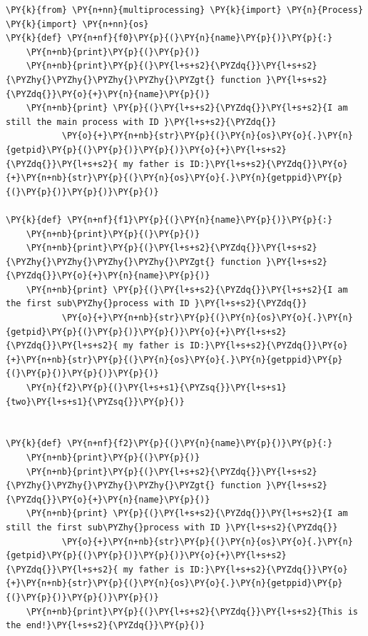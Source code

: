 \begin{Verbatim}[label=\makebox{\url{https://github.com/lucabaldini/cmepda/tree/master/slides/latex/snippets/FatherAndSons.py}},commandchars=\\\{\}]
\PY{k}{from} \PY{n+nn}{multiprocessing} \PY{k}{import} \PY{n}{Process}
\PY{k}{import} \PY{n+nn}{os}
\PY{k}{def} \PY{n+nf}{f0}\PY{p}{(}\PY{n}{name}\PY{p}{)}\PY{p}{:}
    \PY{n+nb}{print}\PY{p}{(}\PY{p}{)}
    \PY{n+nb}{print}\PY{p}{(}\PY{l+s+s2}{\PYZdq{}}\PY{l+s+s2}{\PYZhy{}\PYZhy{}\PYZhy{}\PYZhy{}\PYZgt{} function }\PY{l+s+s2}{\PYZdq{}}\PY{o}{+}\PY{n}{name}\PY{p}{)}
    \PY{n+nb}{print} \PY{p}{(}\PY{l+s+s2}{\PYZdq{}}\PY{l+s+s2}{I am still the main process with ID }\PY{l+s+s2}{\PYZdq{}}
           \PY{o}{+}\PY{n+nb}{str}\PY{p}{(}\PY{n}{os}\PY{o}{.}\PY{n}{getpid}\PY{p}{(}\PY{p}{)}\PY{p}{)}\PY{o}{+}\PY{l+s+s2}{\PYZdq{}}\PY{l+s+s2}{ my father is ID:}\PY{l+s+s2}{\PYZdq{}}\PY{o}{+}\PY{n+nb}{str}\PY{p}{(}\PY{n}{os}\PY{o}{.}\PY{n}{getppid}\PY{p}{(}\PY{p}{)}\PY{p}{)}\PY{p}{)}

\PY{k}{def} \PY{n+nf}{f1}\PY{p}{(}\PY{n}{name}\PY{p}{)}\PY{p}{:}
    \PY{n+nb}{print}\PY{p}{(}\PY{p}{)}
    \PY{n+nb}{print}\PY{p}{(}\PY{l+s+s2}{\PYZdq{}}\PY{l+s+s2}{\PYZhy{}\PYZhy{}\PYZhy{}\PYZhy{}\PYZgt{} function }\PY{l+s+s2}{\PYZdq{}}\PY{o}{+}\PY{n}{name}\PY{p}{)}
    \PY{n+nb}{print} \PY{p}{(}\PY{l+s+s2}{\PYZdq{}}\PY{l+s+s2}{I am the first sub\PYZhy{}process with ID }\PY{l+s+s2}{\PYZdq{}}
           \PY{o}{+}\PY{n+nb}{str}\PY{p}{(}\PY{n}{os}\PY{o}{.}\PY{n}{getpid}\PY{p}{(}\PY{p}{)}\PY{p}{)}\PY{o}{+}\PY{l+s+s2}{\PYZdq{}}\PY{l+s+s2}{ my father is ID:}\PY{l+s+s2}{\PYZdq{}}\PY{o}{+}\PY{n+nb}{str}\PY{p}{(}\PY{n}{os}\PY{o}{.}\PY{n}{getppid}\PY{p}{(}\PY{p}{)}\PY{p}{)}\PY{p}{)}
    \PY{n}{f2}\PY{p}{(}\PY{l+s+s1}{\PYZsq{}}\PY{l+s+s1}{two}\PY{l+s+s1}{\PYZsq{}}\PY{p}{)}


\PY{k}{def} \PY{n+nf}{f2}\PY{p}{(}\PY{n}{name}\PY{p}{)}\PY{p}{:}
    \PY{n+nb}{print}\PY{p}{(}\PY{p}{)}
    \PY{n+nb}{print}\PY{p}{(}\PY{l+s+s2}{\PYZdq{}}\PY{l+s+s2}{\PYZhy{}\PYZhy{}\PYZhy{}\PYZhy{}\PYZgt{} function }\PY{l+s+s2}{\PYZdq{}}\PY{o}{+}\PY{n}{name}\PY{p}{)}
    \PY{n+nb}{print} \PY{p}{(}\PY{l+s+s2}{\PYZdq{}}\PY{l+s+s2}{I am still the first sub\PYZhy{}process with ID }\PY{l+s+s2}{\PYZdq{}}
           \PY{o}{+}\PY{n+nb}{str}\PY{p}{(}\PY{n}{os}\PY{o}{.}\PY{n}{getpid}\PY{p}{(}\PY{p}{)}\PY{p}{)}\PY{o}{+}\PY{l+s+s2}{\PYZdq{}}\PY{l+s+s2}{ my father is ID:}\PY{l+s+s2}{\PYZdq{}}\PY{o}{+}\PY{n+nb}{str}\PY{p}{(}\PY{n}{os}\PY{o}{.}\PY{n}{getppid}\PY{p}{(}\PY{p}{)}\PY{p}{)}\PY{p}{)}
    \PY{n+nb}{print}\PY{p}{(}\PY{l+s+s2}{\PYZdq{}}\PY{l+s+s2}{This is the end!}\PY{l+s+s2}{\PYZdq{}}\PY{p}{)}


\end{Verbatim}
